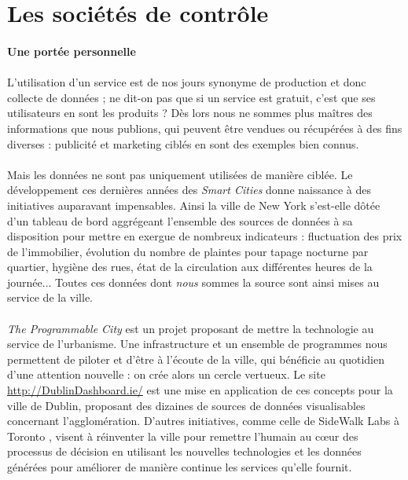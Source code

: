 \section{Les sociétés de contrôle}

\paragraph{Une portée personnelle}

\paragraph{} L'utilisation d'un service est de nos jours synonyme de production et donc collecte de données ; ne dit-on
pas que si un service est gratuit, c'est que ses utilisateurs en sont les produits ? Dès lors nous ne sommes plus maîtres
des informations que nous publions, qui peuvent être vendues ou récupérées à des fins diverses : publicité et marketing
ciblés en sont des exemples bien connus.

\paragraph{} Mais les données ne sont pas uniquement utilisées de manière ciblée. Le développement ces dernières années 
des \emph{Smart Cities} donne naissance à des initiatives auparavant impensables. Ainsi la ville de New York s'est-elle
dôtée d'un tableau de bord \cite{ProgrammableCity1} aggrégeant l'ensemble des sources de données à sa disposition pour 
mettre en exergue de nombreux indicateurs : fluctuation des prix de l'immobilier, évolution du nombre de plaintes pour 
tapage nocturne par quartier, hygiène des rues, état de la circulation aux différentes heures de la journée...
Toutes ces données dont \emph{nous} sommes la source sont ainsi mises au service de la ville.

\paragraph{} \emph{The Programmable City} \cite{ProgrammableCity0} est un projet proposant de mettre la technologie au
service de l'urbanisme. Une infrastructure et un ensemble de programmes nous permettent de piloter et d'être à l'écoute
de la ville, qui bénéficie au quotidien d'une attention nouvelle : on crée alors un cercle vertueux. Le site
\url{http://DublinDashboard.ie/} est une mise en application de ces concepts pour la ville de Dublin, proposant des
dizaines de sources de données visualisables concernant l'agglomération. D'autres initiatives, comme celle de SideWalk Labs
à Toronto \cite{ProgrammableCity3}, visent à réinventer la ville pour remettre l'humain au c\oe{}ur des processus de
décision en utilisant les nouvelles technologies et les données générées pour améliorer de manière continue les services
qu'elle fournit.

